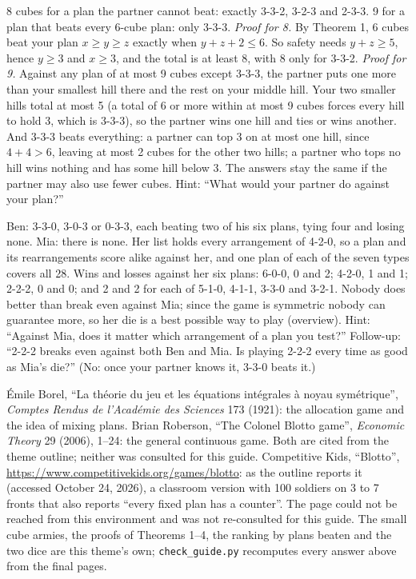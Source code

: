 8 cubes for a plan the partner cannot beat: exactly 3-3-2, 3-2-3 and 2-3-3. 9 for a plan that beats every 6-cube plan: only 3-3-3. \emph{Proof for 8.} By Theorem 1, 6 cubes beat your plan $x\ge y\ge z$ exactly when $y+z+2\le6$. So safety needs $y+z\ge5$, hence $y\ge3$ and $x\ge3$, and the total is at least 8, with 8 only for 3-3-2. \emph{Proof for 9.} Against any plan of at most 9 cubes except 3-3-3, the partner puts one more than your smallest hill there and the rest on your middle hill. Your two smaller hills total at most 5 (a total of 6 or more within at most 9 cubes forces every hill to hold 3, which is 3-3-3), so the partner wins one hill and ties or wins another. And 3-3-3 beats everything: a partner can top 3 on at most one hill, since $4+4>6$, leaving at most 2 cubes for the other two hills; a partner who tops no hill wins nothing and has some hill below 3. The answers stay the same if the partner may also use fewer cubes. Hint: ``What would your partner do against your plan?''

Ben: 3-3-0, 3-0-3 or 0-3-3, each beating two of his six plans, tying four and losing none. Mia: there is none. Her list holds every arrangement of 4-2-0, so a plan and its rearrangements score alike against her, and one plan of each of the seven types covers all 28. Wins and losses against her six plans: 6-0-0, 0 and 2; 4-2-0, 1 and 1; 2-2-2, 0 and 0; and 2 and 2 for each of 5-1-0, 4-1-1, 3-3-0 and 3-2-1. Nobody does better than break even against Mia; since the game is symmetric nobody can guarantee more, so her die is a best possible way to play (overview). Hint: ``Against Mia, does it matter which arrangement of a plan you test?'' Follow-up: ``2-2-2 breaks even against both Ben and Mia. Is playing 2-2-2 every time as good as Mia's die?'' (No: once your partner knows it, 3-3-0 beats it.)

Émile Borel, ``La théorie du jeu et les équations intégrales à noyau symétrique'', \emph{Comptes Rendus de l'Académie des Sciences} 173 (1921): the allocation game and the idea of mixing plans. Brian Roberson, ``The Colonel Blotto game'', \emph{Economic Theory} 29 (2006), 1--24: the general continuous game. Both are cited from the theme outline; neither was consulted for this guide. Competitive Kids, ``Blotto'', \url{https://www.competitivekids.org/games/blotto}: as the outline reports it (accessed October 24, 2026), a classroom version with 100 soldiers on 3 to 7 fronts that also reports ``every fixed plan has a counter''. The page could not be reached from this environment and was not re-consulted for this guide. The small cube armies, the proofs of Theorems 1--4, the ranking by plans beaten and the two dice are this theme's own; \texttt{check\_guide.py} recomputes every answer above from the final pages.

